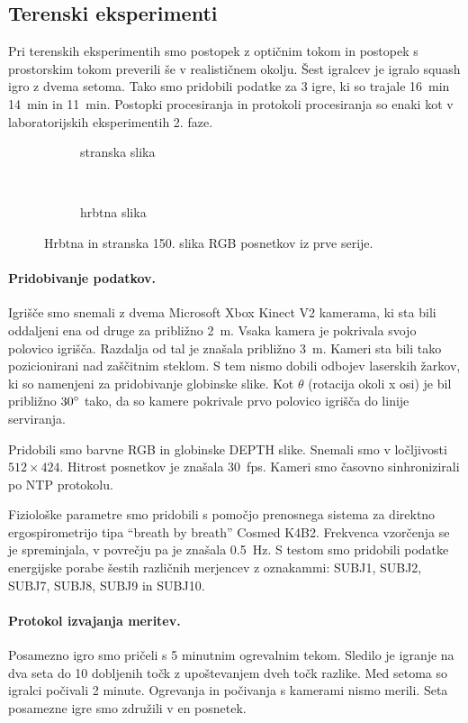 \subsection{Terenski eksperimenti}
Pri terenskih eksperimentih smo postopek z optičnim tokom in postopek s prostorskim tokom preverili še v realističnem okolju. Šest igralcev je igralo squash igro z dvema setoma. Tako smo pridobili podatke za 3 igre, ki so trajale \SI{16}{min} \SI{14}{min} in \SI{11}{min}. Postopki procesiranja in protokoli procesiranja so enaki kot v laboratorijskih eksperimentih 2. faze. 

\begin{figure}[htb]
	\centering
	\begin{subfigure}{0.45\columnwidth}
		\caption{stranska slika}
	\end{subfigure}
	~
	\begin{subfigure}{0.45\columnwidth}
		\caption{hrbtna slika}
	\end{subfigure}
	\caption{Hrbtna in stranska 150. slika RGB posnetkov iz prve serije.}
	\label{fig:primer-posnetka-teren}
\end{figure}

\paragraph{Pridobivanje podatkov.}
Igrišče smo snemali z dvema Microsoft Xbox Kinect V2 kamerama, ki sta bili oddaljeni ena od druge za približno \SI{2}{m}. Vsaka kamera je pokrivala svojo polovico igrišča. Razdalja od tal je znašala približno \SI{3}{m}. Kameri sta bili tako pozicionirani nad zaščitnim steklom. S tem nismo dobili odbojev laserskih žarkov, ki so namenjeni za pridobivanje globinske slike. Kot $\theta$ (rotacija okoli x osi) je bil približno $30^\circ$ tako, da so kamere pokrivale prvo polovico igrišča do linije serviranja.

Pridobili smo barvne RGB in globinske DEPTH slike. Snemali smo v ločljivosti $512 \times 424$. Hitrost posnetkov je znašala \SI{30}{fps}. Kameri smo časovno sinhronizirali po NTP protokolu.

Fiziološke parametre smo pridobili s pomočjo prenosnega sistema za direktno ergospirometrijo tipa ``breath  by breath'' Cosmed K4B2. Frekvenca vzorčenja se je spreminjala, v povrečju pa je znašala \SI{0.5}{\hertz}. S testom smo pridobili podatke energijske porabe šestih različnih merjencev z oznakammi: SUBJ1, SUBJ2, SUBJ7, SUBJ8, SUBJ9 in SUBJ10.

\paragraph{Protokol izvajanja meritev.}
Posamezno igro smo pričeli s 5 minutnim ogrevalnim tekom. Sledilo je igranje na dva seta do 10 dobljenih točk z upoštevanjem dveh točk razlike. Med setoma so igralci počivali 2 minute. Ogrevanja in počivanja s kamerami nismo merili. Seta posamezne igre smo združili v en posnetek.
